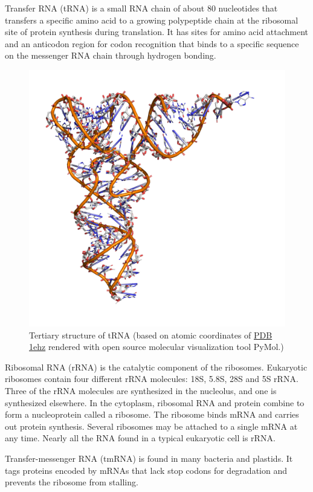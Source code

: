Transfer RNA (tRNA) is a small RNA chain of about 80 nucleotides that transfers a specific amino acid to a growing polypeptide chain at the ribosomal site of protein synthesis during translation. It has sites for amino acid attachment and an anticodon region for codon recognition that binds to a specific sequence on the messenger RNA chain through hydrogen bonding.



\begin{figure}

{\centering \includegraphics[width=0.7\linewidth]{./figures/translation/trna} 

}

\caption{Tertiary structure of tRNA (based on atomic coordinates of \href{https://www.rcsb.org/structure/1ehz}{PDB 1ehz} rendered with open source molecular visualization tool PyMol.)}\label{fig:trnastruc1}
\end{figure}

Ribosomal RNA (rRNA) is the catalytic component of the ribosomes. Eukaryotic ribosomes contain four different rRNA molecules: 18S, 5.8S, 28S and 5S rRNA. Three of the rRNA molecules are synthesized in the nucleolus, and one is synthesized elsewhere. In the cytoplasm, ribosomal RNA and protein combine to form a nucleoprotein called a ribosome. The ribosome binds mRNA and carries out protein synthesis. Several ribosomes may be attached to a single mRNA at any time. Nearly all the RNA found in a typical eukaryotic cell is rRNA.

Transfer-messenger RNA (tmRNA) is found in many bacteria and plastids. It tags proteins encoded by mRNAs that lack stop codons for degradation and prevents the ribosome from stalling.

